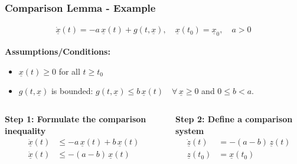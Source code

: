 \documentclass[student, noshadow, lsr, english, aspectratio=169, t]{ITR_LSR_slides}
\begin{document}

\begin{frame}
    \frametitle{Comparison Lemma - Example}

    \vspace{-0.5cm}
    \begin{tcolorbox}[title=Problem: Analyze stability of a scalar perturbed system]
        \vspace{-0.4cm}
        \begin{align*}
            \dot{\underline{x}}(t) = -a\,\underline{x}(t) + g(t, \underline{x}), \quad \underline{x}(t_0) = \underline{x}_0, \quad a > 0
        \end{align*}
    \end{tcolorbox}

    \textbf{Assumptions/Conditions:}
    \begin{itemize}
        \item $\underline{x}(t) \geq 0$ for all $t \geq t_0$
        \item $g(t, \underline{x})$ is bounded: $g(t, \underline{x}) \leq b\,\underline{x}(t) \quad \forall\, \underline{x} \geq 0$ and $0 \leq b < a$.
    \end{itemize}

    \vspace{0.3cm}
    \begin{columns}
        \textbf{Step 1: Formulate the comparison inequality}
        \begin{align*}
            \dot{\underline{x}}(t) &\leq -a\,\underline{x}(t) + b\,\underline{x}(t) \\[0.3cm]
            \dot{\underline{x}}(t) &\leq -(a - b)\,\underline{x}(t)
        \end{align*}

        \textbf{Step 2: Define a comparison system} \\
        \begin{align*}
            \dot{\underline{z}}(t) &= -(a - b)\,\underline{z}(t) \\[0.3cm]
            \underline{z}(t_0) &= \underline{x}(t_0)
        \end{align*}
    \end{columns}
    
\end{frame}
\end{document}
